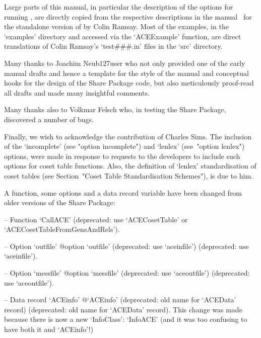 \enditems


Large parts of this manual,  in  particular  the  description  of  the
options for running {\ACE}, are directly copied  from  the  respective
descriptions in the manual~\cite{Ram99} for the standalone version  of
{\ACE} by Colin Ramsay.  Most  of  the  examples,  in  the  `examples'
directory and accessed  via  the  `ACEExample'  function,  are  direct
translations of Colin Ramsay's  `test\#\#\#.in'  files  in  the  `src'
directory.

Many thanks to Joachim Neub{\accent127u}ser who not only provided  one
of the early manual drafts and hence a template for the style  of  the
manual and conceptual hooks for the design of the Share Package  code,
but also meticulously proof-read all drafts and made  many  insightful
comments.

Many thanks also to Volkmar Felsch who, in testing  the  {\ACE}  Share
Package, discovered a number of bugs.

Finally, we wish to acknowledge the contribution of Charles Sims.  The
inclusion of the `incomplete' (see "option incomplete")  and  `lenlex'
(see~"option lenlex") options, were made in response  to  requests  to
the  {\GAP}  developers  to  include  such  options  for  coset  table
functions. Also, the definition of `lenlex' standardisation  of  coset
tables (see Section~"Coset Table Standardisation Schemes"), is due  to
him.


A function, some options and a data record variable have been changed
from older versions of the {\ACE} Share Package:

\beginlist

\item{--} Function   `CallACE'{\undoquotes{}}  (deprecated:  use
`ACECosetTable' or `ACECosetTableFromGensAndRels').

\item{--} Option     `outfile'{\undoquotes{}
{@option `outfile' (deprecated: use  `aceinfile')}}  (deprecated:  use
`aceinfile').

\item{--} Option    `messfile'{\undoquotes{}
{@option `messfile' (deprecated: use `aceoutfile')}} (deprecated:  use
`aceoutfile').

\item{--} Data      record      `ACEinfo'{\undoquotes{}
{@`ACEinfo' (deprecated: old name for `ACEData' record)}} (deprecated:
old name for `ACEData' record). This change was made because there  is
now a new `InfoClass': `InfoACE' (and it was  too  confusing  to  have
both it and `ACEinfo'!)

\endlist

